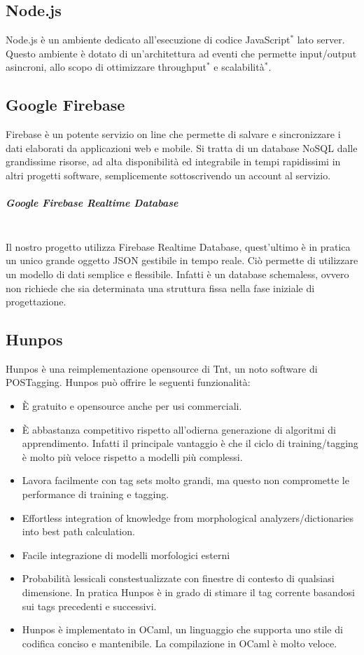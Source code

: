 \subsection{Node.js}
Node.js è un ambiente dedicato all'esecuzione di codice JavaScript$^*$ lato server. Questo ambiente è dotato di un'architettura ad eventi che permette input/output asincroni, allo scopo di ottimizzare throughput$^*$ e scalabilità$^*$.
\subsection{Google Firebase}
Firebase è un potente servizio on line che permette di salvare e sincronizzare i dati elaborati da applicazioni web e mobile. Si tratta di un database NoSQL dalle grandissime risorse, ad alta disponibilità ed integrabile in tempi rapidissimi in altri progetti software, semplicemente sottoscrivendo un account al servizio.

\subparagraph{Google Firebase Realtime Database}
 \noindent \\Il nostro progetto utilizza Firebase Realtime Database, quest'ultimo è in pratica un unico grande oggetto JSON gestibile in tempo reale. Ciò permette di utilizzare un modello di dati semplice e flessibile. Infatti è un database schemaless, ovvero non richiede che sia determinata una struttura fissa nella fase iniziale di progettazione. 
\subsection{Hunpos}
Hunpos è una reimplementazione opensource di Tnt, un noto software di POSTagging.
Hunpos può offrire le seguenti funzionalità:
\begin{itemize}
\item È gratuito e opensource anche per usi commerciali.

\item È abbastanza competitivo rispetto all'odierna generazione di algoritmi di apprendimento. Infatti il principale vantaggio è che il ciclo di training/tagging è molto più veloce rispetto a modelli più complessi.

\item Lavora facilmente con tag sets molto grandi,
ma questo non compromette le performance di training e tagging.

\item Effortless integration of knowledge from morphological analyzers/dictionaries into best path calculation.

\item Facile integrazione di modelli morfologici esterni

\item Probabilità lessicali constestualizzate con finestre di contesto di qualsiasi dimensione. In pratica Hunpos è in grado di stimare il tag corrente basandosi sui tags precedenti e successivi.

\item Hunpos è implementato in OCaml, un linguaggio che supporta uno stile di codifica conciso e mantenibile. La compilazione in OCaml è molto veloce.
\end{itemize}
